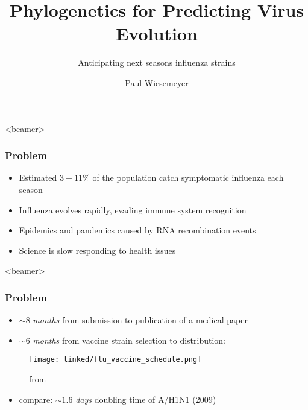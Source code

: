 \documentclass{beamer}
\title{Phylogenetics for Predicting Virus Evolution}
\subtitle{Anticipating next seasons influenza strains}
\author{Paul Wiesemeyer}
\begin{document}
  \shorthandoff{-}
  \frame{\maketitle}

  
    
  \begin{darkframes}




  \begin{frame}<beamer>
    \frametitle{Problem}


    \begin{itemize}
      \itemsep1em
      \item Estimated $3 - 11 \% $ of the population catch symptomatic influenza each season \cite{tokarsOlsen+18a}
      \item Influenza evolves rapidly, evading immune system recognition
      \item Epidemics and pandemics caused by RNA recombination events
      \item Science is slow responding to health issues
    \end{itemize}
  \end{frame}

  \begin{frame}<beamer>
    \frametitle{Problem}
    \begin{itemize}
      \item {\Large $\sim 8$ \textit{months}} from submission to publication of a medical paper \cite{aAMC18}
      \item {\Large $\sim 6$ \textit{months}} from vaccine strain selection to distribution:
    \end{itemize}
    \begin{figure}
        \texttt{[image: linked/flu\_vaccine\_schedule.png]}
        \caption{\footnotesize from \cite{bedford15}}
    \end{figure}{}
    \begin{itemize}
      \item compare: {\LARGE $\sim 1.6$ \textit{days}} doubling time of A/H1N1 (2009) \\
      \footnotesize \cite{mostaco-GuidolinGreer+11}
    \end{itemize}
    

\end{frame}
\end{darkframes}
\end{document}
